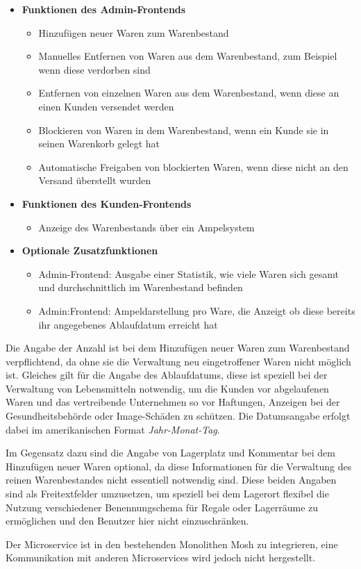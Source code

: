 \begin{itemize}
	\item \textbf{Funktionen des Admin-Frontends}
	\begin{itemize}
		\item Hinzufügen neuer Waren zum Warenbestand
		\item Manuelles Entfernen von Waren aus dem Warenbestand, zum Beispiel wenn diese verdorben sind
		\item Entfernen von einzelnen Waren aus dem Warenbestand, wenn diese an einen Kunden versendet werden
		\item Blockieren von Waren in dem Warenbestand, wenn ein Kunde sie in seinen Warenkorb gelegt hat
		\item Automatische Freigaben von blockierten Waren, wenn diese nicht an den Versand überstellt wurden
	\end{itemize}
	\item \textbf{Funktionen des Kunden-Frontends}
	\begin{itemize}
		\item Anzeige des Warenbestands über ein Ampelsystem
	\end{itemize}
	\item \textbf{Optionale Zusatzfunktionen}
	\begin{itemize}
		\item Admin-Frontend: Ausgabe einer Statistik, wie viele Waren sich gesamt und durchschnittlich im Warenbestand befinden 
		\item Admin:Frontend: Ampeldarstellung pro Ware, die Anzeigt ob diese bereits ihr angegebenes Ablaufdatum erreicht hat
	\end{itemize}
\end{itemize}

Die Angabe der Anzahl ist bei dem Hinzufügen neuer Waren zum Warenbestand verpflichtend, da ohne sie die Verwaltung neu eingetroffener Waren nicht möglich ist. Gleiches gilt für die Angabe des Ablaufdatums, diese ist speziell bei der Verwaltung von Lebensmitteln notwendig, um die Kunden vor abgelaufenen Waren und das vertreibende Unternehmen so vor Haftungen, Anzeigen bei der Gesundheitsbehörde oder Image-Schäden zu schützen. Die Datumsangabe erfolgt dabei im amerikanischen Format \textit{Jahr-Monat-Tag}. \par 
Im Gegensatz dazu sind die Angabe von Lagerplatz und Kommentar bei dem Hinzufügen neuer Waren optional, da diese Informationen für die Verwaltung des reinen Warenbestandes nicht essentiell notwendig sind. Diese beiden Angaben sind als Freitextfelder umzusetzen, um speziell bei dem Lagerort flexibel die Nutzung verschiedener Benennungschema für Regale oder Lagerräume zu ermöglichen und den Benutzer hier nicht einzuschränken. \par 
Der Microservice ist in den bestehenden Monolithen Mosh zu integrieren, eine Kommunikation mit anderen Microservices wird jedoch nicht hergestellt.